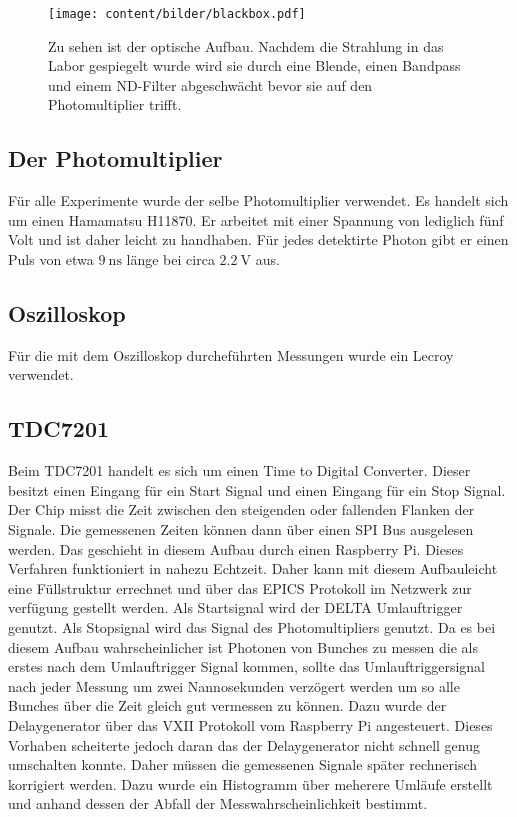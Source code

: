 \begin{figure}
  \centering
  \texttt{[image: content/bilder/blackbox.pdf]}
  \caption{Zu sehen ist der optische Aufbau. Nachdem die Strahlung in das Labor gespiegelt wurde wird sie durch
    eine Blende, einen Bandpass und einem ND-Filter abgeschwächt bevor sie auf den Photomultiplier trifft. }
  \label{fig:blackbox}
\end{figure}


\subsection{Der Photomultiplier}
\label{sec:Photomultiplier}
Für alle Experimente wurde der selbe Photomultiplier verwendet. Es handelt sich um einen Hamamatsu
H11870. Er arbeitet mit einer Spannung von lediglich fünf Volt und ist daher leicht zu handhaben.
Für jedes detektirte Photon gibt er einen Puls von etwa $\SI{9}{\nano\second}$ länge bei circa 
$\SI{2,2}{\volt}$ aus.



\subsection{Oszilloskop}
\label{sec:Oszilloskop}
Für die mit dem Oszilloskop durcheführten Messungen wurde ein Lecroy verwendet.

\subsection{TDC7201}
\label{sec:TDC}
Beim TDC7201 handelt es sich um einen Time to Digital Converter. Dieser besitzt einen Eingang für ein 
Start Signal und einen Eingang für ein Stop Signal. Der Chip misst die Zeit zwischen den steigenden oder 
fallenden Flanken der Signale. Die gemessenen Zeiten können dann über einen SPI Bus ausgelesen werden.
Das geschieht in diesem Aufbau durch einen Raspberry Pi. Dieses Verfahren funktioniert in nahezu Echtzeit. 
Daher kann mit diesem Aufbauleicht eine Füllstruktur errechnet und über das EPICS Protokoll im Netzwerk 
zur verfügung gestellt werden. Als Startsignal wird der DELTA Umlauftrigger genutzt. Als Stopsignal wird 
das Signal des Photomultipliers genutzt. Da es bei diesem Aufbau wahrscheinlicher ist Photonen von Bunches 
zu messen die als erstes nach dem Umlauftrigger Signal kommen, sollte das Umlauftriggersignal nach jeder 
Messung um zwei Nannosekunden verzögert werden um so alle Bunches über die Zeit gleich gut vermessen zu können.
Dazu wurde der Delaygenerator über das VXII Protokoll vom Raspberry Pi angesteuert.
Dieses Vorhaben scheiterte jedoch daran das der Delaygenerator nicht schnell genug umschalten konnte.
Daher müssen die gemessenen Signale später rechnerisch korrigiert werden. Dazu wurde ein Histogramm über 
meherere Umläufe erstellt und anhand dessen der Abfall der Messwahrscheinlichkeit bestimmt.

